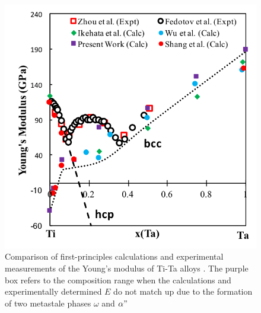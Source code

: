 \newpage
\begin{figure}[H]
	\centering
	\includegraphics[width=\textwidth]{Chapter-1/Figures/TiTaElastic.png}
	\caption{Comparison of first-principles calculations \cite{Wu2010a,Ikehata2004} and experimental measurements of the Young's modulus of Ti-Ta alloys \cite{Zhou2004a,Zhou2009a,Fedotov1985}. The purple box refers to the composition range when the calculations and experimentally determined $E$ do not match up due to the formation of two metastale phases $\omega$ and $\alpha"$}
	\label{Ch1-figure:titaelastic}
\end{figure}
